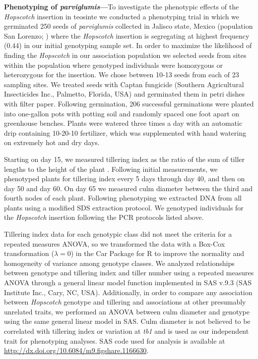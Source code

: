 \documentclass[11pt]{article} %
\begin{document}
\begin{linenumbers}
\begin{flushleft}
\textbf{Phenotyping of \emph{parviglumis}---}To investigate the phenotypic effects of the \emph{Hopscotch} insertion in teosinte we conducted a phenotyping trial in which we germinated 250 seeds of \emph{parviglumis} collected in Jalisco state, Mexico (population San Lorenzo; \citealt{Hufford2010}) where the \emph{Hopscotch} insertion is segregating at highest frequency (0.44) in our initial genotyping sample set. In order to maximize the likelihood of finding the \emph{Hopscotch} in our association population we selected seeds from sites within the population where genotyped individuals were homozygous or heterozygous for the insertion. We chose between 10-13 seeds from each of 23 sampling sites. We treated seeds with Captan fungicide (Southern Agricultural Insecticides Inc., Palmetto, Florida, USA) and germinated them in petri dishes with filter paper. Following germination, 206 successful germinations were planted into one-gallon pots with potting soil and randomly spaced one foot apart on greenhouse benches. Plants were watered three times a day with an automatic drip containing 10-20-10 fertilizer, which was supplemented with hand watering on extremely hot and dry days. 

Starting on day 15, we measured tillering index as the ratio of the sum of tiller lengths to the height of the plant \citep{Briggs2007}. Following initial measurements, we phenotyped plants for tillering index every 5 days through day 40, and then on day 50 and day 60. On day 65 we measured culm diameter between the third and fourth nodes of each plant. 
Following phenotyping we extracted DNA from all plants using a modified SDS extraction protocol. 
We genotyped individuals for the \emph{Hopscotch} insertion following the PCR protocols listed above. 

Tillering index data for each genotypic class did not meet the criteria for a repeated measures ANOVA, so we transformed the data with a Box-Cox transformation ($\lambda=0$) in the Car Package for R \citep{FoxWeisberg2011} to improve the normality and homogeneity of variance among genotype classes.  We analyzed relationships between genotype and tillering index and tiller number using a repeated measures ANOVA through a general linear model function implemented in SAS v.9.3 (SAS Institute Inc., Cary, NC, USA). Additionally, in order to compare any association between \emph{Hopscotch} genotype and tillering and associations at other presumably unrelated traits, we performed an ANOVA between culm diameter and genotype using the same general linear model in SAS. Culm diameter is not believed to be correlated with tillering index or variation at \emph{tb1} and is used as our independent trait for phenotyping analyses. SAS code used for analysis is available at \url{ http://dx.doi.org/10.6084/m9.figshare.1166630}. 


\end{flushleft}
\end{linenumbers}
\end{document}
